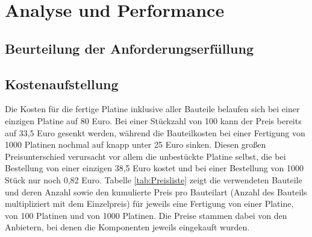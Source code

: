 \chapter{Analyse und Performance}\label{kap7}

\section{Beurteilung der Anforderungserfüllung}

\section{Kostenaufstellung}
Die Kosten für die fertige Platine inklusive aller Bauteile belaufen sich bei einer einzigen Platine auf 80 Euro. Bei einer Stückzahl von 100 kann der Preis bereits auf 33,5 Euro gesenkt werden, während die Bauteilkosten bei einer Fertigung von 1000 Platinen nochmal auf knapp unter 25 Euro sinken. Diesen großen Preisunterschied verursacht vor allem die unbestückte Platine selbst, die bei Bestellung von einer einzigen 38,5 Euro kostet und bei einer Bestellung von 1000 Stück nur noch 0,82 Euro. Tabelle \ref{tab:Preisliste} zeigt die verwendeten Bauteile und deren Anzahl sowie den kumulierte Preis pro Bauteilart (Anzahl des Bauteils multipliziert mit dem Einzelpreis) für jeweils eine Fertigung von einer Platine, von 100 Platinen und von 1000 Platinen. Die Preise stammen dabei von den Anbietern, bei denen die Komponenten jeweils eingekauft wurden.


